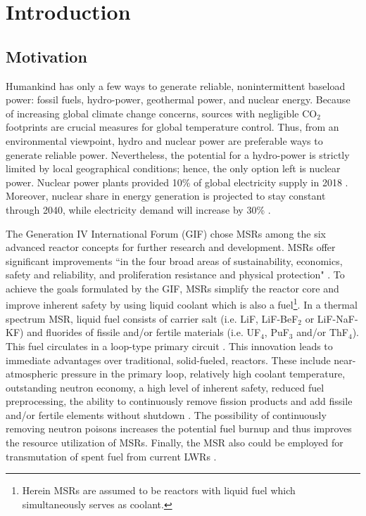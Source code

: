 \chapter[Introduction]{Introduction}
\section{Motivation}
Humankind has only a few ways to generate reliable, nonintermittent baseload 
power: fossil fuels, hydro-power, geothermal power, and nuclear energy. 
Because of increasing global climate change concerns, sources with negligible 
CO$_2$ footprints are crucial measures for global temperature control. Thus, 
from an environmental viewpoint, hydro and nuclear power are preferable ways 
to generate reliable power. Nevertheless, the potential for a hydro-power is 
strictly limited by local geographical conditions; hence, the only option left 
is nuclear power. Nuclear power plants provided 10\% of global electricity 
supply in 2018 \cite{iea_nuclear_2019}. Moreover, nuclear share in energy 
generation is projected to stay constant through 2040, while electricity 
demand will increase by 30\% \cite{noauthor_world_2017}. 

The Generation IV International Forum (GIF) chose \glspl{MSR} among the six 
advanced reactor concepts for further research and development. \glspl{MSR} 
offer significant improvements ``in the four broad areas of sustainability, 
economics, safety and reliability, and proliferation resistance and physical 
protection" \cite{doe_technology_2002}. To achieve the goals formulated by the 
GIF, \glspl{MSR} simplify the reactor core and improve inherent safety by 
using liquid coolant which is also a fuel\footnote{Herein \glspl{MSR} are 
assumed to be reactors with liquid fuel which simultaneously serves 
as coolant.}. In a thermal spectrum \gls{MSR}, liquid fuel consists 
of carrier salt (i.e. LiF, LiF-BeF$_2$ or LiF-NaF-KF) and fluorides of fissile 
and/or fertile materials (i.e. UF$_4$, PuF$_3$ and/or ThF$_4$). This fuel  
circulates in a loop-type primary circuit \cite{haubenreich_experience_1970}. 
This innovation leads to immediate advantages over traditional, 
solid-fueled, reactors. These include near-atmospheric pressure 
in the primary loop, relatively high coolant temperature, outstanding 
neutron economy, a high level of inherent safety, reduced fuel 
preprocessing, the ability to continuously remove fission products 
and add fissile and/or fertile elements without shutdown 
\cite{leblanc_molten_2010}. The possibility of continuously removing 
neutron poisons increases the potential fuel burnup and thus 
improves the resource utilization of \glspl{MSR}. Finally, the \gls{MSR} 
also could be employed for transmutation of 
spent fuel from current \glspl{LWR} \cite{fratoni_design_2004}.

